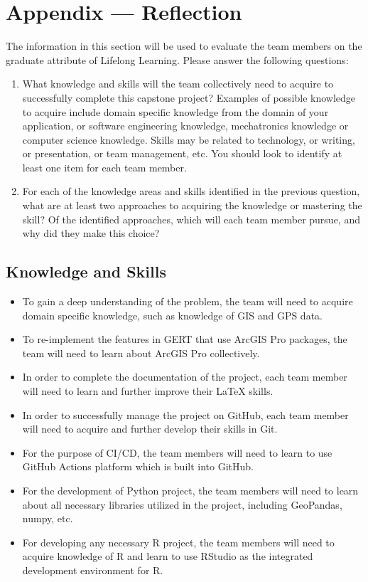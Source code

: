 \documentclass[12pt, titlepage]{article}
\begin{document}
\section*{Appendix --- Reflection}
The information in this section will be used to evaluate the team members on the
graduate attribute of Lifelong Learning.  Please answer the following questions:

\begin{enumerate}
  \item What knowledge and skills will the team collectively need to acquire to
  successfully complete this capstone project?  Examples of possible knowledge
  to acquire include domain specific knowledge from the domain of your
  application, or software engineering knowledge, mechatronics knowledge or
  computer science knowledge.  Skills may be related to technology, or writing,
  or presentation, or team management, etc.  You should look to identify at
  least one item for each team member.
  \item For each of the knowledge areas and skills identified in the previous
  question, what are at least two approaches to acquiring the knowledge or
  mastering the skill?  Of the identified approaches, which will each team
  member pursue, and why did they make this choice?
\end{enumerate}

\subsection*{Knowledge and Skills}
\begin{itemize}
    \item To gain a deep understanding of the problem, the team will need to acquire domain specific knowledge, such as knowledge of GIS and GPS data.
    \item To re-implement the features in GERT that use ArcGIS Pro packages, the team will need to learn about ArcGIS Pro collectively.
    \item In order to complete the documentation of the project, each team member will need to learn and further improve their LaTeX skills.
    \item In order to successfully manage the project on GitHub, each team member will need to acquire and further develop their skills in Git.
    \item For the purpose of CI/CD, the team members will need to learn to use GitHub Actions platform which is built into GitHub.
    \item For the development of Python project, the team members will need to learn about all necessary libraries utilized in the project,
    including GeoPandas, numpy, etc.
    \item For developing any necessary R project, the team members will need to acquire knowledge of R and learn to use RStudio as the integrated development environment for R.
\end{itemize}
\end{document}
